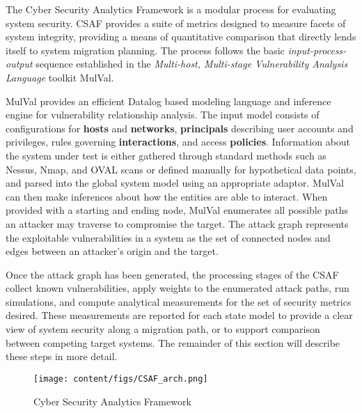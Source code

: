 The Cyber Security Analytics Framework\cite{Abraham_2016} is a modular process for evaluating system security. CSAF provides a suite of metrics designed to measure facets of system integrity, providing a means of quantitative comparison that directly lends itself to system migration planning. The process follows the basic \textit{input-process-output} sequence established in the \textit{Multi-host, Multi-stage Vulnerability Analysis Language}\cite{Ou_Appel_2005} toolkit MulVal.

MulVal provides an efficient\cite{Rao_1997} Datalog based modeling language and inference engine for vulnerability relationship analysis. The input model consists of configurations for \textbf{hosts} and \textbf{networks}, \textbf{principals} describing user accounts and privileges, rules governing \textbf{interactions}, and access \textbf{policies}. Information about the system under test is either gathered through standard methods\cite{Ou_Govindavajhala_Appel} such as Nessus, Nmap, and OVAL scans or defined manually for hypothetical data points, and parsed into the global system model using an appropriate adaptor. MulVal can then make inferences about how the entities are able to interact. When provided with a starting and ending node, MulVal enumerates all possible paths an attacker may traverse to compromise the target. The attack graph represents the exploitable vulnerabilities in a system as the set of connected nodes and edges between an attacker’s origin and the target.

Once the attack graph has been generated, the processing stages of the CSAF collect known vulnerabilities, apply weights to the enumerated attack paths, run simulations, and compute analytical measurements for the set of security metrics desired. These measurements are reported for each state model to provide a clear view of system security along a migration path, or to support comparison between competing target systems. The remainder of this section will describe these steps in more detail. %


\begin{figure}[ht]
\centering
\texttt{[image: content/figs/CSAF\_arch.png]}
\caption{Cyber Security Analytics Framework\cite{Abraham_2016}}
\label{fig:framework}
\end{figure} 
